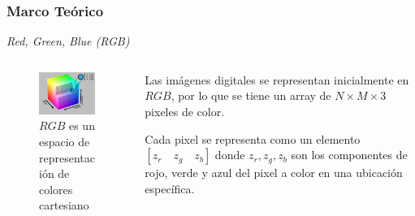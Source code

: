 \documentclass[usenames,dvipsnames]{beamer}
\begin{document}




\begin{frame} 
\frametitle{Marco Teórico} 
\begin{exampleblock}{\textit{Red, Green, Blue (RGB)}}
\end{exampleblock}

\begin{columns}[onlytextwidth]
\begin{column}{.45\textwidth}
\begin{figure}
  \includegraphics[width=4.5cm]{graphics/RGB_Cube_Show_lowgamma_cutout_b.png}
  \caption{$RGB$ es un espacio de representación de colores cartesiano}
\end{figure}
\end{column}
\hfill
\begin{column}{.45\textwidth}
             	
				Las imágenes digitales se representan inicialmente en $RGB$, por lo que se tiene un array de $N \times M \times 3$ pixeles de color.

				Cada pixel se representa como un elemento $[z_r \quad z_g \quad z_b]$ donde $z_r,z_g,z_b$ son los componentes de rojo, verde y azul del pixel a color en una ubicación específica.
\end{column}
\end{columns} 
             	

\end{frame}
\end{document}
